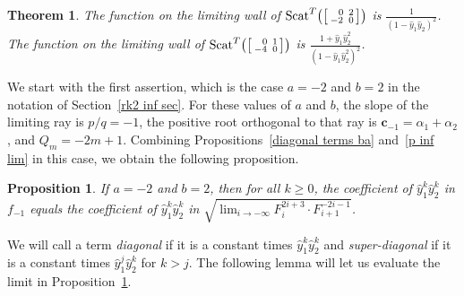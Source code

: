 \documentclass[10pt,a4paper]{amsart}
\newtheorem{thm}[theorem]{Theorem}
\newtheorem{prop}[theorem]{Proposition}
\theoremstyle{definition}
\DeclareMathOperator{\Scat}{Scat}
\newcommand{\newword}[1]{\emph{#1}}
\newcommand{\cc}{\mathbf{c}}
\newcommand{\hy}{\hat{y}}
\begin{document}
\begin{thm}\label{rk2 aff formula}
The function on the limiting wall of $\Scat^T\bigl(\begin{bsmallmatrix}\,\,\,\,\,0&\,2\\-2&\,0\end{bsmallmatrix}\bigr)$ is $\displaystyle\frac1{(1-\hy_1\hy_2)^2}$.
The function on the limiting wall of $\Scat^T\bigl(\begin{bsmallmatrix}\,\,\,\,\,0&\,1\\-4&\,0\end{bsmallmatrix}\bigr)$ is $\displaystyle\frac{1+\hy_1\hy_2^2}{(1-\hy_1\hy_2^2)^2}$.
\end{thm}

We start with the first assertion, which is the case $a=-2$ and $b=2$ in the notation of Section~\ref{rk2 inf sec}.
For these values of $a$ and $b$, the slope of the limiting ray is $p/q=-1$, the positive root orthogonal to that ray is $\cc_{-1}=\alpha_1+\alpha_2$, and $Q_m=-2m+1$.
Combining Propositions~\ref{diagonal terms ba} and~\ref{p inf lim} in this case, we obtain the following proposition.
\begin{prop}\label{diagonal terms}
If $a=-2$ and $b=2$, then for all $k\ge0$, the coefficient of $\hy_1^k\hy_2^k$ in $f_{-1}$ equals the coefficient of $\hy_1^k\hy_2^k$ in $\sqrt{\lim_{i\to-\infty}F_i^{2i+3}\cdot F_{i+1}^{-2i-1}}$.
\end{prop}

We will call a term \newword{diagonal} if it is a constant times $\hy_1^k\hy_2^k$ and \newword{super-diagonal} if it is a constant times $\hy_1^j\hy_2^k$ for $k>j$.
The following lemma will let us evaluate the limit in Proposition~\ref{diagonal terms}.
\end{document}
